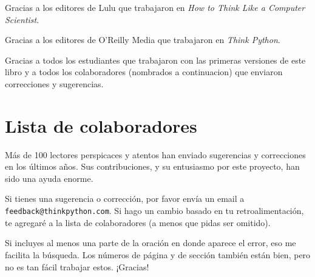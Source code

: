 \documentclass[10pt]{book}
\begin{document}
Gracias a los editores de Lulu que trabajaron en
{\em How to Think Like a Computer Scientist}.

Gracias a los editores de O'Reilly Media que trabajaron en
{\em Think Python}.

Gracias a todos los estudiantes que trabajaron con las primeras
versiones de este libro y a todos los colaboradores (nombrados
a continuacion) que enviaron correcciones y sugerencias.


\section*{Lista de colaboradores}

Más de 100 lectores perspicaces y atentos han enviado
sugerencias y correcciones en los últimos años.  Sus
contribuciones, y su entusiasmo por este proyecto, han sido una
ayuda enorme.

Si tienes una sugerencia o corrección, por favor envía un email a
{\tt feedback@thinkpython.com}.  Si hago un cambio basado en tu
retroalimentación, te agregaré a la lista de colaboradores
(a menos que pidas ser omitido).

Si incluyes al menos una parte de la oración en donde
aparece el error, eso me facilita la búsqueda.  Los números de página
y de sección también están bien, pero no es tan fácil trabajar estos.
¡Gracias!
\end{document}
